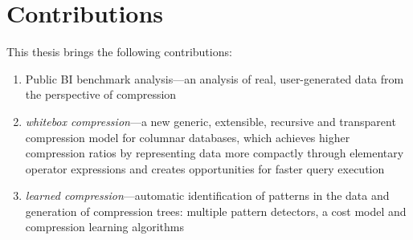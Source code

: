 
\section{Contributions}

This thesis brings the following contributions:
\begin{enumerate}[1)]
\item Public BI benchmark analysis---an analysis of real, user-generated data from the perspective of compression
\item \textit{whitebox compression}---a new generic, extensible, recursive and transparent compression model for columnar databases, which achieves higher compression ratios by representing data more compactly through elementary operator expressions and creates opportunities for faster query execution
\item \textit{learned compression}---automatic identification of patterns in the data and generation of compression trees: multiple pattern detectors, a cost model and compression learning algorithms
\end{enumerate}






